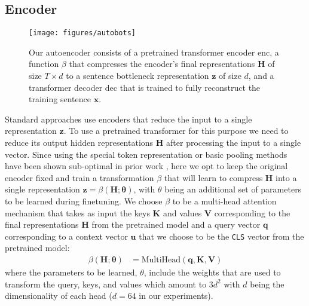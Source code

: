 \subsection{Encoder}
\begin{figure}[ht]
\centering
\hspace{-2mm}\texttt{[image: figures/autobots]} 
\caption{\label{fig:model} %
Our autoencoder consists of a pretrained transformer encoder $\text{enc}$, a function $\beta$ that compresses the encoder's  final representations $\mathbf{H}$ of size $T \times d$ 
to a sentence bottleneck representation $\mathbf{z}$ of size $d$, and a transformer decoder $\text{dec}$ that is trained to fully reconstruct the training sentence $\boldsymbol{x}$. }
\end{figure}Standard approaches use encoders that reduce the input to a single representation $\mathbf{z}$. To use a pretrained transformer for this purpose we need to reduce its output hidden representations $\mathbf{H}$ after processing the input to a single vector. Since using the special token representation or basic pooling methods have been shown sub-optimal in prior work \cite{Reimers2019SentenceBERT}, here we opt to keep the original encoder fixed and train a transformation $\beta$ that will learn to compress $\mathbf{H}$ into a single representation   $\mathbf{z} = \beta(\mathbf{H}; \mathbf{\theta})$, with $\theta$ being an additional set of parameters to be learned during finetuning. We choose $\beta$ to be a multi-head attention mechanism that takes as input the keys  $\mathbf{K}$ and values $\mathbf{V}$ corresponding to the final representations $\mathbf{H}$ from the pretrained model
and a query vector $\mathbf{q}$ corresponding to a context vector $\mathbf{u}$ that we choose to be the \texttt{CLS} vector from the pretrained model:
%
\begin{align}
   \beta(\mathbf{H}; \mathbf{\theta}) &= \text{MultiHead}(\mathbf{q}, \mathbf{K}, \mathbf{V}) 
\end{align}
%
\noindent where the parameters to be learned, $\theta$, include the weights that are used to transform the query, keys, and values which amount to $ 3 d^2 $ with $d$ being the dimensionality of each head ($d = 64$ in our experiments).


